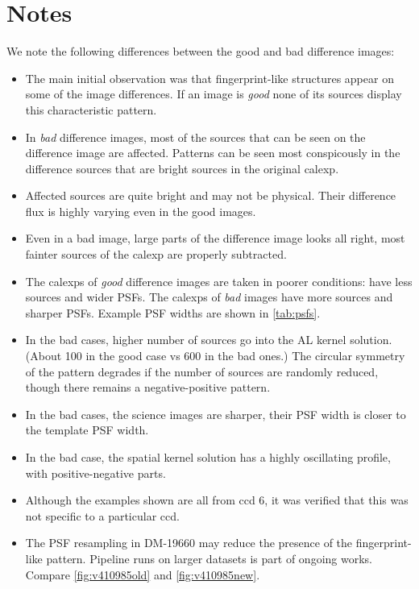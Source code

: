 \documentclass{article}
\begin{document}
\section{Notes}
We note the following differences between the good and bad difference
images:
\begin{itemize}
  \item The main initial observation was that fingerprint-like structures
    appear on some of the image differences. If an image is \emph{good}
    none of its sources display this characteristic pattern.
  \item In \emph{bad} difference images, most of the sources that can
    be seen on the difference image are affected. Patterns can be seen
    most conspicously in the difference sources that are bright
    sources in the original calexp.
  \item Affected sources are quite bright and may not be physical. Their
    difference flux is highly varying even in the good images.
  \item Even in a bad image, large parts of the difference image looks
    all right, most fainter sources of the calexp are properly
    subtracted.
  \item The calexps of \emph{good} difference images are taken in
    poorer conditions: have less sources and wider PSFs. The calexps
    of \emph{bad} images have more sources and sharper PSFs. Example
    PSF widths are shown in \cref{tab:psfs}.
  \item In the bad cases, higher number of sources go into the AL
    kernel solution. (About 100 in the good case vs 600 in the bad ones.) The
    circular symmetry of the pattern degrades if the number of sources
    are randomly reduced, though there remains a negative-positive
    pattern.
  \item In the bad cases, the science images are sharper, their PSF
    width is closer to the template PSF width.
  \item In the bad case, the spatial kernel solution has a highly
    oscillating profile, with positive-negative parts.
  \item Although the examples shown are all from ccd 6, it was
    verified that this was not specific to a particular ccd.
   \item The PSF resampling in DM-19660 may reduce the presence of the
     fingerprint-like pattern. Pipeline runs on larger datasets is
     part of ongoing works.  Compare \cref{fig:v410985old} and \cref{fig:v410985new}.
\end{itemize}
\end{document}
